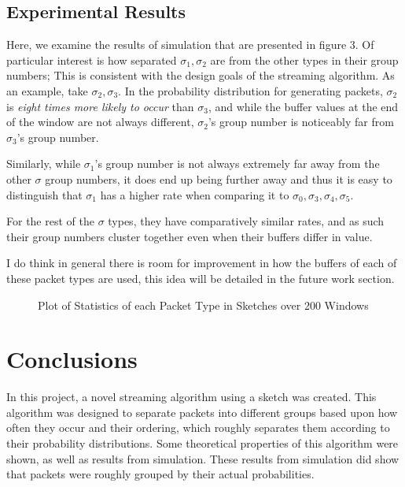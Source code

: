 \documentclass[conference]{IEEEtran}
\begin{document}
\subsection{Experimental Results}
Here, we examine the results of simulation that are presented in figure 3.  Of 
particular interest is how separated $\sigma_1,\sigma_2$ are from the other types in 
their group numbers;  This is consistent with the design goals of the streaming algorithm.  As an example, take $\sigma_2,\sigma_3$.  In the probability distribution
for generating packets, $\sigma_2$ is \textit{eight times more likely to occur} than
$\sigma_3$, and while the buffer values at the end of the window are not always different, $\sigma_2$'s group number is noticeably far from $\sigma_3$'s group number.

Similarly, while $\sigma_1$'s group number is not always extremely far away from the
other $\sigma$ group numbers, it does end up being further away and thus it is easy to distinguish that $\sigma_1$ has a higher rate when comparing it to $\sigma_0, \sigma_3, \sigma_4, \sigma_5$.

For the rest of the $\sigma$ types, they have comparatively similar rates, and as such their group numbers cluster together even when their buffers differ in value.

I do think in general there is room for improvement in how the buffers of each of these packet types are used, this idea will be detailed in the future work section.

\begin{figure*}[b]
  \caption{Plot of Statistics of each Packet Type in Sketches over 200 Windows}
    
\end{figure*}

\section{Conclusions}
In this project, a novel streaming algorithm using a sketch was created.  This algorithm was designed to separate packets into different groups based upon how often they occur and their ordering, which roughly separates them according to their probability distributions.  Some theoretical properties of this algorithm were shown, as well as results from simulation.  These results from simulation did show that packets were roughly grouped by their actual probabilities.
\end{document}
